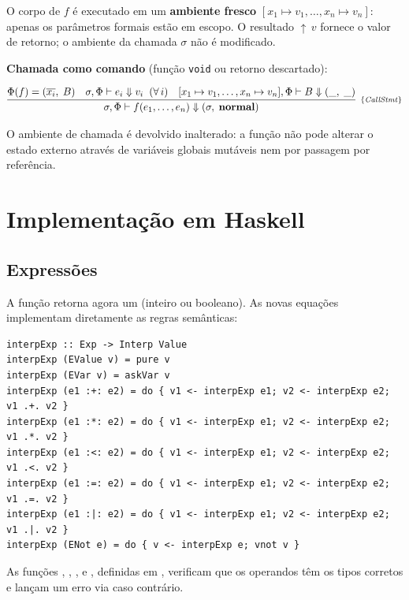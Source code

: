 O corpo de \(f\) é executado em um \textbf{ambiente fresco}
\([x_1 \mapsto v_1,\ldots,x_n \mapsto v_n]\): apenas os parâmetros
formais estão em escopo. O resultado \({\uparrow}\,v\) fornece o valor
de retorno; o ambiente da chamada \(\sigma\) não é modificado.

\textbf{Chamada como comando} (função \texttt{void} ou retorno descartado):

\[
  \infer[_{\{\mathit{CallStmt}\}}]
  {\sigma,\Phi \vdash f(e_1,\ldots,e_n) \Downarrow (\sigma,\; \mathbf{normal})}
  {
    \Phi(f) = (\overline{x_i},\; B)
    \quad
    \sigma,\Phi \vdash e_i \Downarrow v_i \;\;(\forall\, i)
    \quad
    [x_1 \mapsto v_1,\ldots,x_n \mapsto v_n],\Phi \vdash B \Downarrow (\_,\; \_)
  }
\]

O ambiente de chamada é devolvido inalterado: a função não pode
alterar o estado externo através de variáveis globais mutáveis nem por
passagem por referência.

\section{Implementação em Haskell}

\subsection{Expressões}

A função  retorna agora um
 (inteiro ou booleano). As novas
equações implementam diretamente as regras semânticas:

\begin{verbatim}
interpExp :: Exp -> Interp Value
interpExp (EValue v) = pure v
interpExp (EVar v) = askVar v
interpExp (e1 :+: e2) = do { v1 <- interpExp e1; v2 <- interpExp e2; v1 .+. v2 }
interpExp (e1 :*: e2) = do { v1 <- interpExp e1; v2 <- interpExp e2; v1 .*. v2 }
interpExp (e1 :<: e2) = do { v1 <- interpExp e1; v2 <- interpExp e2; v1 .<. v2 }
interpExp (e1 :=: e2) = do { v1 <- interpExp e1; v2 <- interpExp e2; v1 .=. v2 }
interpExp (e1 :|: e2) = do { v1 <- interpExp e1; v2 <- interpExp e2; v1 .|. v2 }
interpExp (ENot e) = do { v <- interpExp e; vnot v }
\end{verbatim}

As funções ,
, ,
 e ,
definidas em , verificam que os
operandos têm os tipos corretos e lançam um erro via
 caso contrário.


